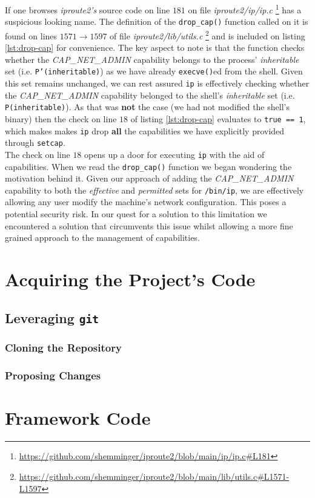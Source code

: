         If one browses \textit{iproute2's} source code on \cite{bib:iproute2-src} line $181$ on file \textit{iproute2/ip/ip.c} \footnote{\url{https://github.com/shemminger/iproute2/blob/main/ip/ip.c\#L181}} has a suspicious looking name. The definition of the \texttt{drop\_cap()} function called on it is found on lines $1571 \to 1597$ of file \textit{iproute2/lib/utils.c} \footnote{\url{https://github.com/shemminger/iproute2/blob/main/lib/utils.c\#L1571-L1597}} and is included on listing \ref{lst:drop-cap} for convenience. The key aspect to note is that the function checks whether the \textit{CAP\_NET\_ADMIN} capability belongs to the process' \textit{inheritable} set (i.e. \texttt{P'(inheritable)}) as we have already \texttt{execve()}ed from the shell. Given this set remains unchanged, we can rest assured \texttt{ip} is effectively checking whether the \textit{CAP\_NET\_ADMIN} capability belonged to the shell's \textit{inheritable} set (i.e. \texttt{P(inheritable)}). As that was \textbf{not} the case (we had not modified the shell's binary) then the check on line $18$ of listing \ref{lst:drop-cap} evaluates to \texttt{true == 1}, which makes makes \texttt{ip} drop \textbf{all} the capabilities we have explicitly provided through \texttt{setcap}.\\

        

        The check on line $18$ opens up a door for executing \texttt{ip} with the aid of capabilities. When we read the \texttt{drop\_cap()} function we began wondering the motivation behind it. Given our approach of adding the \textit{CAP\_NET\_ADMIN} capability to both the \textit{effective} and \textit{permitted} sets for \texttt{/bin/ip}, we are effectively allowing any user modify the machine's network configuration. This poses a potential security risk. In our quest for a solution to this limitation we encountered a solution that circumvents this issue whilst allowing a more fine grained approach to the management of capabilities.\\

    \section{Acquiring the Project's Code}
        \subsection{Leveraging \texttt{git}}
            \subsubsection{Cloning the Repository}
            \subsubsection{Proposing Changes}
    \section{Framework Code}